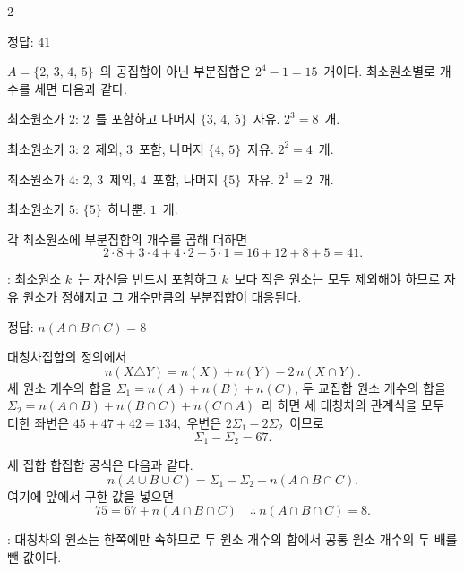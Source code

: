 \documentclass[10pt,fleqn]{article}
\begin{document}
\begin{multicols*}{2}
\begin{dmanswerbox}
정답: $41$
\end{dmanswerbox}

$A=\{2,\,3,\,4,\,5\}$\ 의 공집합이 아닌 부분집합은 $2^{4}-1=15$\ 개이다. 최소원소별로 개수를 세면 다음과 같다.

\vspace{3mm}
최소원소가 $2$: $2$\ 를 포함하고 나머지 $\{3,\,4,\,5\}$\ 자유. $2^{3}=8$\ 개.

최소원소가 $3$: $2$\ 제외, $3$\ 포함, 나머지 $\{4,\,5\}$\ 자유. $2^{2}=4$\ 개.

최소원소가 $4$: $2,\,3$\ 제외, $4$\ 포함, 나머지 $\{5\}$\ 자유. $2^{1}=2$\ 개.

최소원소가 $5$: $\{5\}$\ 하나뿐. $1$\ 개.

\vspace{3mm}
각 최소원소에 부분집합의 개수를 곱해 더하면
\[ 2\cdot 8+3\cdot 4+4\cdot 2+5\cdot 1=16+12+8+5=41. \]

\begin{dmcriticalpoint}
: 최소원소 $k$\ 는 자신을 반드시 포함하고 $k$\ 보다 작은 원소는 모두 제외해야 하므로 자유 원소가 정해지고 그 개수만큼의 부분집합이 대응된다.
\end{dmcriticalpoint}

\begin{dmanswerbox}
정답: $n(A\cap B\cap C)=8$
\end{dmanswerbox}

대칭차집합의 정의에서
\[ n(X\triangle Y)=n(X)+n(Y)-2\,n(X\cap Y). \]
세 원소 개수의 합을 $\Sigma_1=n(A)+n(B)+n(C)$, 두 교집합 원소 개수의 합을 $\Sigma_2=n(A\cap B)+n(B\cap C)+n(C\cap A)$\ 라 하면 세 대칭차의 관계식을 모두 더한 좌변은 $45+47+42=134$,\ 우변은 $2\Sigma_1-2\Sigma_2$\ 이므로
\[ \Sigma_1-\Sigma_2=67. \]

세 집합 합집합 공식은 다음과 같다.
\[ n(A\cup B\cup C)=\Sigma_1-\Sigma_2+n(A\cap B\cap C). \]
여기에 앞에서 구한 값을 넣으면
\[ 75=67+n(A\cap B\cap C)\quad\therefore\ n(A\cap B\cap C)=8. \]

\begin{dmcriticalpoint}
: 대칭차의 원소는 한쪽에만 속하므로 두 원소 개수의 합에서 공통 원소 개수의 두 배를 뺀 값이다.
\end{dmcriticalpoint}


\end{multicols*}
\end{document}

